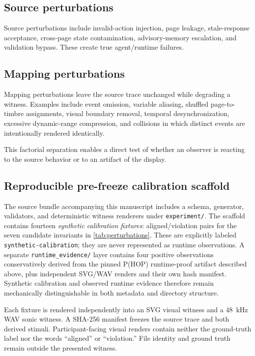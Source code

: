 \documentclass[11pt]{article}
\begin{document}
\subsection{Source perturbations}
Source perturbations include invalid-action injection, page leakage, stale-response acceptance, cross-page state contamination, advisory-memory escalation, and validation bypass. These create true agent/runtime failures.

\subsection{Mapping perturbations}
Mapping perturbations leave the source trace unchanged while degrading a witness. Examples include event omission, variable aliasing, shuffled page-to-timbre assignments, visual boundary removal, temporal desynchronization, excessive dynamic-range compression, and collisions in which distinct events are intentionally rendered identically.

This factorial separation enables a direct test of whether an observer is reacting to the source behavior or to an artifact of the display.

\subsection{Reproducible pre-freeze calibration scaffold}
The source bundle accompanying this manuscript includes a schema, generator, validators, and deterministic witness renderers under \texttt{experiment/}. The scaffold contains fourteen \emph{synthetic calibration fixtures}: aligned/violation pairs for the seven candidate invariants in \cref{tab:perturbations}. These are explicitly labeled \texttt{synthetic-calibration}; they are never represented as runtime observations. A separate \texttt{runtime\_evidence/} layer contains four positive observations conservatively derived from the pinned P(HOP) runtime-proof artifact described above, plus independent SVG/WAV renders and their own hash manifest. Synthetic calibration and observed runtime evidence therefore remain mechanically distinguishable in both metadata and directory structure.

Each fixture is rendered independently into an SVG visual witness and a 48~kHz WAV sonic witness. A SHA-256 manifest freezes the source trace and both derived stimuli. Participant-facing visual renders contain neither the ground-truth label nor the words ``aligned'' or ``violation.'' File identity and ground truth remain outside the presented witness.
\end{document}
